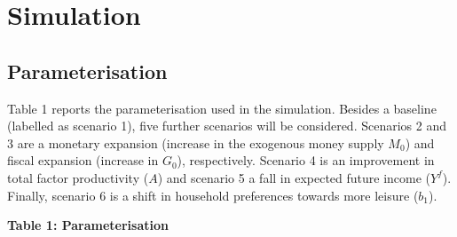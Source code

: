 \documentclass[
  letterpaper,
  DIV=11,
  numbers=noendperiod]{scrreprt}
\begin{document}
\section{Simulation}\label{simulation}

\subsection{Parameterisation}\label{parameterisation}

Table 1 reports the parameterisation used in the simulation. Besides a
baseline (labelled as scenario 1), five further scenarios will be
considered. Scenarios 2 and 3 are a monetary expansion (increase in the
exogenous money supply \(M_0\)) and fiscal expansion (increase in
\(G_0\)), respectively. Scenario 4 is an improvement in total factor
productivity (\(A\)) and scenario 5 a fall in expected future income
(\(Y^f\)). Finally, scenario 6 is a shift in household preferences
towards more leisure (\(b_1\)).

\textbf{Table 1: Parameterisation}
\end{document}
